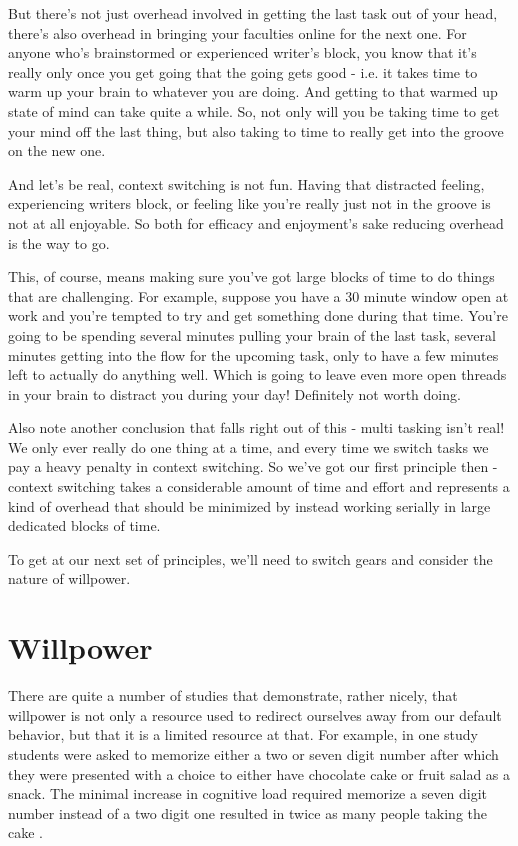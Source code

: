 \documentclass[11pt,a5paper]{book}
\begin{document}
But there's not just overhead involved in getting the last task out of your head, there's also overhead in bringing your faculties online for the next one. For anyone who's brainstormed or experienced writer's block, you know that it's really only once you get going that the going gets good - i.e. it takes time to warm up your brain to whatever you are doing. And getting to that warmed up state of mind can take quite a while. So, not only will you be taking time to get your mind off the last thing, but also taking to time to really get into the groove on the new one. 
\newline

And let's be real, context switching is not fun. Having that distracted feeling, experiencing writers block, or feeling like you're really just not in the groove is not at all enjoyable. So both for efficacy and enjoyment's sake reducing overhead is the way to go. 
\newline

This, of course, means making sure you've got large blocks of time to do things that are challenging. For example, suppose you have a 30 minute window open at work and you're tempted to try and get something done during that time. You're going to be spending several minutes pulling your brain of the last task, several minutes getting into the flow for the upcoming task, only to have a few minutes left to actually do anything well. Which is going to leave even more open threads in your brain to distract you during your day! Definitely not worth doing. 
\newline

Also note another conclusion that falls right out of this - multi tasking isn't real! We only ever really do one thing at a time, and every time we switch tasks we pay a heavy penalty in context switching. So we've got our first principle then - context switching takes a considerable amount of time and effort and represents a kind of overhead that should be minimized by instead working serially in large dedicated blocks of time.
\newline

To get at our next set of principles, we'll need to switch gears and consider the nature of willpower.

\section{Willpower}
There are quite a number of studies that demonstrate, rather nicely, that willpower is not only a resource used to redirect ourselves away from our default behavior, but that it is a limited resource at that. For example, in one study students were asked to memorize either a two or seven digit number after which they were presented with a choice to either have chocolate cake or fruit salad as a snack. The minimal increase in cognitive load required memorize a seven digit number instead of a two digit one resulted in twice as many people taking the cake \cite{keller}. 
\newline
\end{document}
